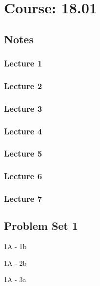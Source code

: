 \onecolumn
\chapter{Course: 18.01}
\section{Notes}
\subsection{Lecture 1}


\subsection{Lecture 2}
\subsection{Lecture 3}
\subsection{Lecture 4}
\subsection{Lecture 5}
\subsection{Lecture 6}
\subsection{Lecture 7}

\section{Problem Set 1}

\begin{problem}{1A - 1b}
\end{problem}
\begin{solution}
\end{solution}

\begin{problem}{1A - 2b}
\end{problem}
\begin{solution}
\end{solution}

\begin{problem}{1A - 3a}
\end{problem}
\begin{solution}
\end{solution}

